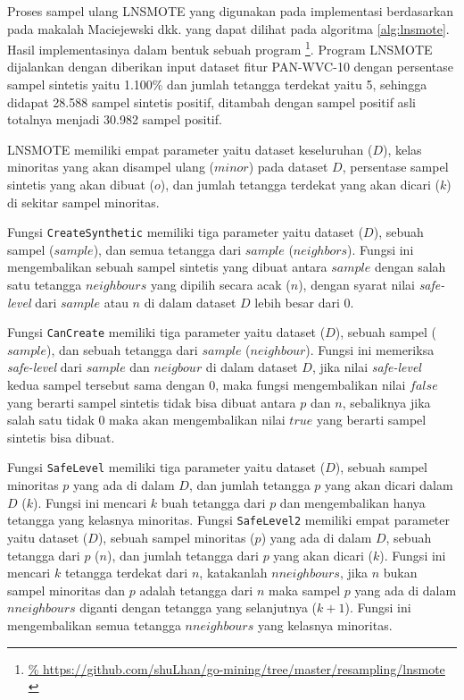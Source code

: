 Proses sampel ulang LNSMOTE yang digunakan pada implementasi berdasarkan
pada makalah Maciejewski dkk.
\cite{maciejewski2011local}
yang dapat dilihat pada algoritma
\ref{alg:lnsmote}.
Hasil implementasinya dalam bentuk sebuah program
\footnote{\url{%
https://github.com/shuLhan/go-mining/tree/master/resampling/lnsmote
}}.
Program LNSMOTE dijalankan dengan diberikan input dataset fitur PAN-WVC-10
dengan persentase sampel sintetis yaitu 1.100\% dan jumlah tetangga terdekat
yaitu 5, sehingga didapat 28.588 sampel sintetis positif, ditambah dengan
sampel positif asli totalnya menjadi 30.982 sampel positif.

	

LNSMOTE memiliki empat parameter yaitu dataset keseluruhan ($D$), kelas
minoritas yang akan disampel ulang ($minor$) pada dataset $D$, persentase
sampel sintetis yang akan dibuat ($o$), dan jumlah tetangga terdekat yang akan
dicari ($k$) di sekitar sampel minoritas.

Fungsi \texttt{CreateSynthetic} memiliki tiga parameter yaitu dataset ($D$),
sebuah sampel ($sample$), dan semua tetangga dari $sample$ ($neighbors$).
Fungsi ini mengembalikan sebuah sampel sintetis yang dibuat antara $sample$
dengan salah satu tetangga $neighbours$ yang dipilih secara acak ($n$), dengan
syarat nilai \textit{safe-level} dari $sample$ atau $n$ di dalam dataset $D$
lebih besar dari $0$.

Fungsi \texttt{CanCreate} memiliki tiga parameter yaitu dataset ($D$), sebuah
sampel ($sample$), dan sebuah tetangga dari $sample$ ($neighbour$).
Fungsi ini memeriksa \textit{safe-level} dari $sample$ dan $neigbour$ di dalam
dataset $D$, jika nilai \textit{safe-level} kedua sampel tersebut sama dengan
0, maka fungsi mengembalikan nilai $false$ yang berarti sampel sintetis tidak
bisa dibuat antara $p$ dan $n$, sebaliknya jika salah satu tidak 0
maka akan mengembalikan nilai $true$ yang berarti sampel sintetis bisa dibuat.

Fungsi \texttt{SafeLevel} memiliki tiga parameter yaitu dataset ($D$), sebuah
sampel minoritas $p$ yang ada di dalam $D$, dan jumlah tetangga $p$ yang akan dicari
dalam $D$ ($k$).
Fungsi ini mencari $k$ buah tetangga dari $p$ dan mengembalikan hanya tetangga
yang kelasnya minoritas.
\newpage
Fungsi \texttt{SafeLevel2} memiliki empat parameter yaitu dataset ($D$), sebuah
sampel minoritas ($p$) yang ada di dalam $D$, sebuah tetangga dari $p$ ($n$),
dan jumlah tetangga dari $p$ yang akan dicari ($k$).
Fungsi ini mencari $k$ tetangga terdekat dari $n$, katakanlah $nneighbours$,
jika $n$ bukan sampel minoritas dan $p$ adalah tetangga dari $n$ maka sampel
$p$ yang ada di dalam $nneighbours$ diganti dengan tetangga yang selanjutnya
($k+1$).
Fungsi ini mengembalikan semua tetangga $nneighbours$ yang kelasnya minoritas.

